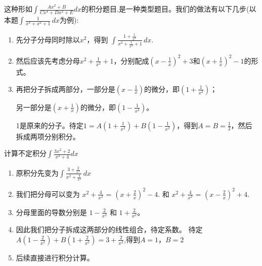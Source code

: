 \begin{remark}
这种形如$\displaystyle \int \frac{Ax^2 + B }{Cx^4 + Dx^2 + E} dx $的积分题目,是一种类型题目。我们的做法有以下几步(以本题$\int \frac{1}{x^4 + x^2 + 1} \, dx $为例):
\begin{enumerate}
    \item 先分子分母同时除以$x^2$，得到
    $ \displaystyle  \int \frac{1 + \frac{1}{x^2}}{x^2 + \frac{1}{x^2} + 1} \, dx  $.
    \item 然后应该先考虑分母$x^2 + \frac{1}{x^2} + 1$，分别配成$(x - \frac{1}{x})^2+3$和$(x + \frac{1}{x})^2-1$的形式。
    \item 再把分子拆成两部分，一部分是$(x - \frac{1}{x})$的微分，即$(1+ \frac{1}{x^2} )$；
    
    另一部分是$(x + \frac{1}{x})$的微分，即$(1 - \frac{1}{x^2})$。

    1是原来的分子。待定$1 = A(1 + \frac{1}{x^2}) + B(1 - \frac{1}{x^2})$，得到$A=B=\frac{1}{2}$，然后拆成两项分别积分。
\end{enumerate}
\end{remark}

\newpage



\begin{example}
计算不定积分$ \displaystyle \int \frac{3x^2 + 2}{x^4 + 4} dx $
\end{example}

\begin{remark}
    \begin{enumerate}
    \item 原积分先变为$\displaystyle \int \frac{3 + \frac{2}{x^2}}{x^2 + \frac{4}{x^2}} \, dx$

    \item 我们把分母可以变为
    $x^2 + \frac{4}{x^2}$ = $(x + \frac{2}{x})^2 - 4$. 和
    $x^2 + \frac{4}{x^2}$ = $(x - \frac{2}{x})^2 + 4$. 

    \item 分母里面的导数分别是
    $1 - \frac{2}{x^2}$ 和 $1 + \frac{2}{x^2}$。


    \item 因此我们把分子拆成这两部分的线性组合，待定系数。
    待定 $A(1 - \frac{2}{x^2}) + B(1 + \frac{2}{x^2}) = 3 + \frac{2}{x^2} $,得到$A=1$，$B=2$
    
    \item 后续直接进行积分计算。
    \end{enumerate}
\end{remark}

